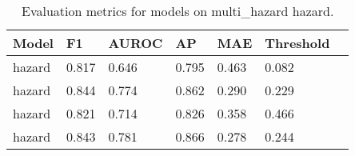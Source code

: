 \begin{table}[h!]
    \centering
    \begin{tabularx}{0.45\textwidth}{@{}lXXXXXX@{}}
    \toprule
    \textbf{Model} & \textbf{F1} & \textbf{AUROC} & \textbf{AP} & \textbf{MAE} & \textbf{Threshold} \\
    \midrule
    hazard & 0.817 & 0.646 & 0.795 & 0.463 & 0.082 \\
    hazard & 0.844 & 0.774 & 0.862 & 0.290 & 0.229 \\
    hazard & 0.821 & 0.714 & 0.826 & 0.358 & 0.466 \\
    hazard & 0.843 & 0.781 & 0.866 & 0.278 & 0.244 \\
    \bottomrule
    \end{tabularx}
    \caption{Evaluation metrics for models on multi_hazard hazard.}
    \label{tab:evaluation_metrics}
\end{table}
